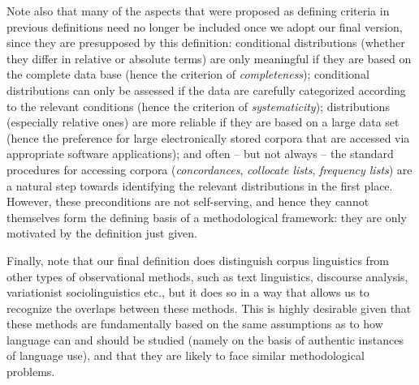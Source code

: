 Note also that many of the aspects that were proposed as defining criteria in previous definitions need no longer be included once we adopt our final version, since they are presupposed by this definition: conditional distributions (whether they differ in relative or absolute terms) are only meaningful if they are based on the complete data base (hence the criterion of \emph{completeness}); conditional distributions can only be assessed if the data are carefully categorized according to the relevant conditions (hence the criterion of \emph{systematicity}); distributions (especially relative ones) are more reliable if they are based on a large data set (hence the preference for large electronically stored corpora that are accessed via appropriate software applications); and often -- but not always -- the standard procedures for accessing corpora (\emph{concordances}, \emph{collocate lists}, \emph{frequency lists}) are a natural step towards identifying the relevant distributions in the first place. However, these preconditions are not self-serving, and hence they cannot themselves form the defining basis of a methodological framework: they are only motivated by the definition just given.

Finally, note that our final definition does distinguish corpus linguistics from other types of observational methods, such as text linguistics, discourse analysis, variationist sociolinguistics etc., but it does so in a way that allows us to recognize the overlaps between these methods. This is highly desirable given that these methods are fundamentally based on the same assumptions as to how language can and should be studied (namely on the basis of authentic instances of language use), and that they are likely to face similar methodological problems.

